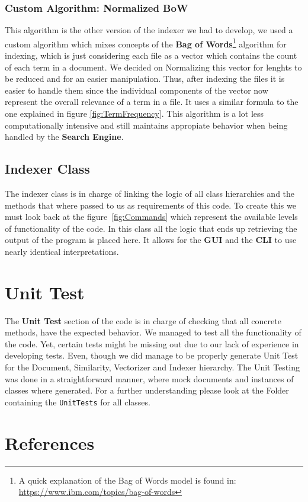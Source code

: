\documentclass{article}
\begin{document}
\subsubsection{Custom Algorithm: Normalized BoW} 
This algorithm is the other version of the indexer we had to develop, we used a custom algorithm which mixes concepts of the \textbf{Bag of Words}\footnote{A quick explanation of the Bag of Words model is found in: \url{https://www.ibm.com/topics/bag-of-words}} algorithm for indexing, which is just considering each file as a vector which contains the count of each term in a document. We decided on  Normalizing this vector for lenghts to be reduced and for an easier manipulation. Thus, after indexing the files it is easier to handle them since the individual components of the vector now represent the overall relevance of a term in a file. It uses a similar formula to the one explained in figure \ref*{fig:TermFrequency}. This algorithm is a lot less computationally intensive and still maintains appropiate behavior when being handled by the \textbf{Search Engine}.
\subsection{Indexer Class}
The indexer class is in charge of linking the logic of all class hierarchies and the methods that where passed to us as requirements of this code. To create this we must look back at the figure~\ref{fig:Commands} which represent the available levels of functionality of the code. In this class all the logic that ends up retrieving the output of the program is placed here. It allows for the \textbf{GUI} and the \textbf{CLI} to use nearly identical interpretations. 
\section{Unit Test}
The \textbf{Unit Test} section of the code is in charge of checking that all concrete methods, have the expected behavior. We managed to test all the functionality of the code. Yet, certain tests might be missing out due to our lack of experience in developing tests. Even, though we did manage to be properly generate Unit Test for the Document, Similarity, Vectorizer and Indexer hierarchy. The Unit Testing was done in a straightforward manner, where mock documents and instances of classes where generated. For a further understanding please look at the Folder containing the \texttt{UnitTests} for all classes.
\section{References}
\end{document}
